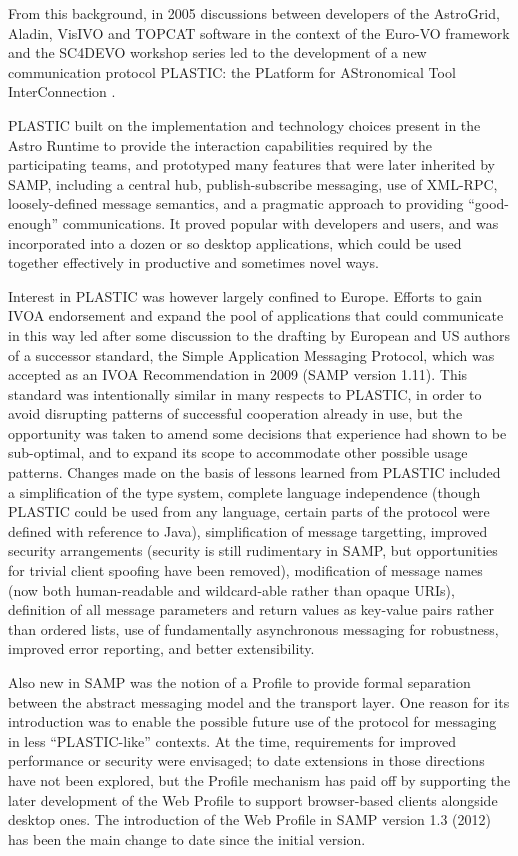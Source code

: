 \documentclass[5p]{elsarticle}
\begin{document}
From this background, in 2005 discussions between developers of
the AstroGrid, Aladin,
VisIVO \citep{2007PASP..119..898C} and
TOPCAT \citep{2005ASPC..347...29T} software
in the context of the Euro-VO
framework and the SC4DEVO workshop series led to the development
of a new communication protocol PLASTIC:
the PLatform for AStronomical Tool InterConnection
\citep{2007ASPC..376..511T,plastic_note}.

PLASTIC built on the implementation and technology choices
present in the Astro Runtime to provide the interaction
capabilities required by the participating teams,
and prototyped many features that were later inherited by SAMP,
including a central hub, publish-subscribe messaging, use of XML-RPC,
loosely-defined message semantics, and a pragmatic approach
to providing ``good-enough'' communications.
It proved popular with developers and users, %
and was incorporated into a dozen or so desktop applications,
which could be used together effectively
in productive and sometimes novel ways.

Interest in PLASTIC was however largely confined to Europe.
Efforts to gain IVOA endorsement and expand the pool
of applications that could communicate in this way
led after some discussion to the drafting by European and US authors
of a successor standard, the Simple Application Messaging Protocol,
which was accepted as an IVOA Recommendation in 2009 (SAMP version 1.11).
This standard was intentionally similar in many respects to PLASTIC,
in order to avoid disrupting patterns of successful
cooperation already in use,
but the opportunity was taken to amend some decisions that experience had
shown to be sub-optimal, and to expand its scope to accommodate
other possible usage patterns.
Changes made on the basis of lessons learned from PLASTIC included
a simplification of the type system,
complete language independence
(though PLASTIC could be used from any language,
certain parts of the protocol were defined with reference to Java),
simplification of message targetting,
improved security arrangements
(security is still rudimentary in SAMP, but opportunities for
trivial client spoofing have been removed),
modification of message names
(now both human-readable and wildcard-able rather than opaque URIs),
definition of all message parameters and return values as
key-value pairs rather than ordered lists,
use of fundamentally asynchronous messaging for robustness,
improved error reporting,
and better extensibility.

Also new in SAMP was the notion of a Profile to provide formal separation
between the abstract messaging model and the transport layer.
One reason for its introduction was to enable the possible future
use of the protocol for messaging in less ``PLASTIC-like'' contexts.
At the time, requirements for improved performance or security were
envisaged; to date extensions in those directions have not been
explored, but the Profile mechanism has paid off by supporting
the later development of the Web Profile to support browser-based
clients alongside desktop ones.
The introduction of the Web Profile in SAMP version 1.3 (2012)
has been the main change to date since the initial version.
\end{document}
